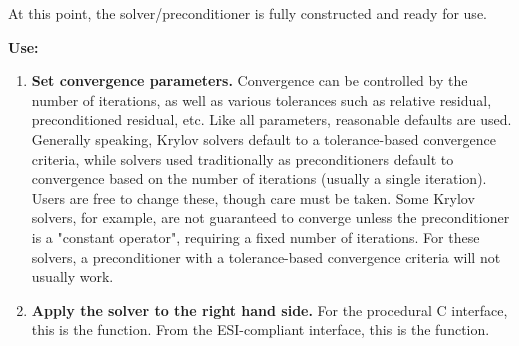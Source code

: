 At this point, the solver/preconditioner is fully constructed and ready for use. 

{\bf Use:}

\begin{enumerate}

\item
{\bf Set convergence parameters.} Convergence can be controlled by the number of iterations,
as well as various tolerances such as relative residual, preconditioned residual, etc.
Like all parameters, reasonable defaults are used. Generally speaking, Krylov solvers
default to a tolerance-based convergence criteria, while solvers used traditionally as
preconditioners default to convergence based on the number of iterations (usually a single
iteration). Users are free to change these, though care must be taken. Some Krylov solvers,
for example, are not guaranteed to converge unless the preconditioner is a "constant operator",
requiring a fixed number of iterations. For these solvers, a preconditioner
with a tolerance-based convergence criteria will not usually work.

\item
{\bf Apply the solver to the right hand side.} For the procedural C interface, this is the 
 function. From the ESI-compliant interface, this is the  function.

\end{enumerate}
